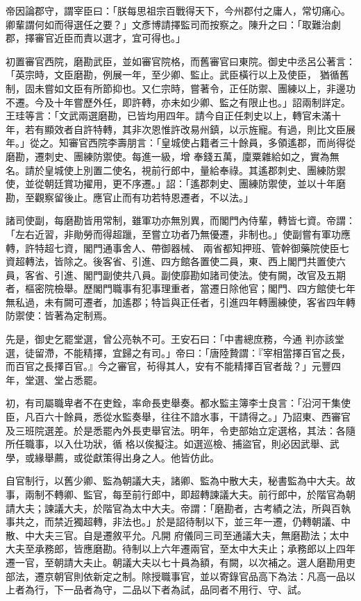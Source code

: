 \begin{pinyinscope}
 帝因論郡守，謂宰臣曰：「朕每思祖宗百戰得天下，今州郡付之庸人，常切痛心。卿輩謂何如而得選任之要？」文彥博請擇監司而按察之。陳升之曰：「取難治劇郡，擇審官近臣而責以選才，宜可得也。」



 初置審官西院，磨勘武臣，並如審官院格，而舊審官曰東院。御史中丞呂公著言：「英宗時，文臣磨勘，例展一年，至少卿、監止。武臣橫行以上及使臣，
 猶循舊制，固未嘗如文臣有所節抑也。又仁宗時，嘗著令，正任防禦、團練以上，非邊功不遷。今及十年嘗歷外任，即許轉，亦未如少卿、監之有限止也。」詔兩制詳定。王珪等言：「文武兩選磨勘，已皆均用四年。請今自正任刺史以上，轉官未滿十年，若有顯效者自許特轉，其非次恩惟許改易州鎮，以示旌寵。有過，則比文臣展年。」從之。知審官西院李壽朋言：「皇城使占籍者三十餘員，多領遙郡，而尚得從磨勘，遷刺史、團練防禦使。每進一級，增
 奉錢五萬，廩粟雜給如之，實為無名。請於皇城使上別置二使名，視前行郎中，量給奉祿。其遙郡刺史、團練防禦使，並從朝廷賞功擢用，更不序遷。」詔：「遙郡刺史、團練防禦使，並以十年磨勘，至觀察留後止。應官止而有功若特恩遷者，不以法。」



 諸司使副，每磨勘皆用常制，雖軍功亦無別異，而閣門內侍輩，轉皆七資。帝謂：「左右近習，非勛勞而得超躐，至嘗立功者乃無優遷，非制也。」使副嘗有軍功應轉，許特超七資，閣門通事舍人、帶御器械、
 兩省都知押班、管幹御藥院使臣七資超轉法，皆除之。後客省、引進、四方館各置使二員，東、西上閣門共置使六員，客省、引進、閣門副使共八員。副使靡勘如諸司使法。使有闕，改官及五期者，樞密院檢舉。歷閣門職事有犯事理重者，當遷日除他官；閣門、四方館使七年無私過，未有闕可遷者，加遙郡；特旨與正任者，引進四年轉團練使，客省四年轉防禦使：皆著為定制焉。



 先是，御史乞罷堂選，曾公亮執不可。王安石曰：「中書總庶務，今通
 判亦該堂選，徒留滯，不能精擇，宜歸之有司。」帝曰：「唐陸贄謂：『宰相當擇百官之長，而百官之長擇百官。』今之審官，茍得其人，安有不能精擇百官者哉？」元豐四年，堂選、堂占悉罷。



 初，有司屬職卑者不在吏銓，率命長吏舉奏。都水監主簿李士良言：「沿河干集使臣，凡百六十餘員，悉從水監奏舉，往往不諳水事，干請得之。」乃詔東、西審官及三班院選差。於是悉罷內外長吏舉官法。明年，令吏部始立定選格，其法：各隨所任職事，以入仕功狀，循
 格以俟擬注。如選巡檢、捕盜官，則必因武舉、武學，或緣舉薦，或從獻策得出身之人。他皆仿此。



 自官制行，以舊少卿、監為朝議大夫，諸卿、監為中散大夫，秘書監為中大夫。故事，兩制不轉卿、監官，每至前行郎中，即超轉諫議大夫。前行郎中，於階官為朝請大夫；諫議大夫，於階官為太中大夫。帝謂：「磨勘者，古考績之法，所與百執事共之，而禁近獨超轉，非法也。」於是詔待制以下，並三年一遷，仍轉朝議、中散、中大夫三官。自是遷敘平允。凡開
 府儀同三司至通議大夫，無磨勘法；太中大夫至承務郎，皆應磨勘。待制以上六年遷兩官，至太中大夫止；承務郎以上四年遷一官，至朝請大夫止。朝議大夫以七十員為額，有闕，以次補之。選人磨勘用吏部法，遷京朝官則依新定之制。除授職事官，並以寄錄官品高下為法：凡高一品以上者為行，下一品者為守，二品以下者為試，品同者不用行、守、試。




\end{pinyinscope}
